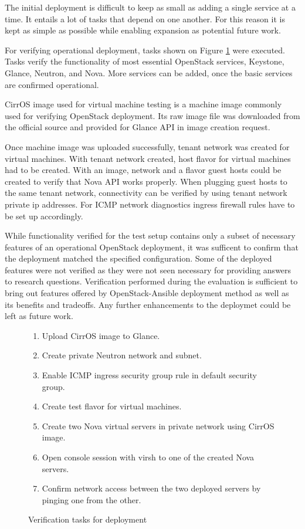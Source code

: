 The initial deployment is difficult to keep as small as adding a single service
at a time. It entails a lot of tasks that depend on one another. For this
reason it is kept as simple as possible while enabling expansion as potential
future work.

For verifying operational deployment, tasks shown on Figure
\ref{fig:verify-tasks} were executed. Tasks verify the functionality of most
essential OpenStack services, Keystone, Glance, Neutron, and Nova. More
services can be added, once the basic services are confirmed operational.

CirrOS image used for virtual machine testing is a machine image commonly used
for verifying OpenStack deployment. Its raw image file was downloaded from the
official source and provided for Glance API in image creation request.

Once machine image was uploaded successfully, tenant network was created for
virtual machines. With tenant network created, host flavor for virtual machines
had to be created. With an image, network and a flavor guest hosts could be
created to verify that Nova API works properly. When plugging guest hosts to
the same tenant network, connectivity can be verified by using tenant network
private ip addresses. For ICMP network diagnostics ingress firewall rules have
to be set up accordingly.

While functionality verified for the test setup contains only a subset of
necessary features of an operational OpenStack deployment, it was sufficent to
confirm that the deployment matched the specified configuration. Some of the
deployed features were not verified as they were not seen necessary for
providing answers to research questions. Verification performed during the
evaluation is sufficient to bring out features offered by OpenStack-Ansible
deployment method as well as its benefits and tradeoffs. Any further
enhancements to the deploymet could be left as future work.

\begin{figure}[t]
\centering
\begin{enumerate}
  \itemsep0em
  \item Upload CirrOS image to Glance.
  \item Create private Neutron network and subnet.
  \item Enable ICMP ingress security group rule in default security group.
  \item Create test flavor for virtual machines.
  \item Create two Nova virtual servers in private network using CirrOS image.
  \item Open console session with virsh to one of the created Nova servers.
  \item Confirm network access between the two deployed servers by pinging one
        from the other.
\end{enumerate}
\caption{Verification tasks for deployment}
\label{fig:verify-tasks}
\end{figure}

